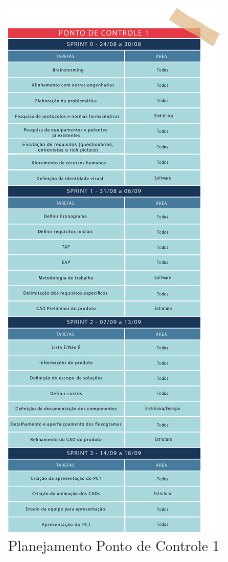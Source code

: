 \begin{apendicesenv}
\vspace{-1.6cm}
\begin{figure}[H]
    \centering
    \includegraphics[width=0.5\textwidth]{figuras/sprint-pc1.png}
    \caption{Planejamento Ponto de Controle 1}
    \label{fig:Sprint_pc1}
\end{figure}


\end{apendicesenv}
